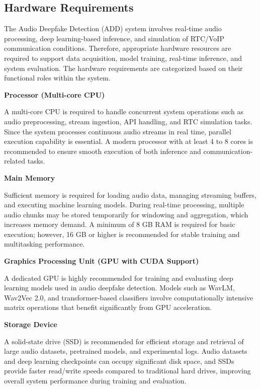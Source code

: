 \subsection{Hardware Requirements}

The Audio Deepfake Detection (ADD) system involves real-time audio processing, deep learning-based inference, and simulation of RTC/VoIP communication conditions. Therefore, appropriate hardware resources are required to support data acquisition, model training, real-time inference, and system evaluation. The hardware requirements are categorized based on their functional roles within the system.

\textbf{Processor (Multi-core CPU)}

A multi-core CPU is required to handle concurrent system operations such as audio preprocessing, stream ingestion, API handling, and RTC simulation tasks. Since the system processes continuous audio streams in real time, parallel execution capability is essential. A modern processor with at least 4 to 8 cores is recommended to ensure smooth execution of both inference and communication-related tasks.

\textbf{Main Memory}

Sufficient memory is required for loading audio data, managing streaming buffers, and executing machine learning models. During real-time processing, multiple audio chunks may be stored temporarily for windowing and aggregation, which increases memory demand. A minimum of 8 GB RAM is required for basic execution; however, 16 GB or higher is recommended for stable training and multitasking performance.

\textbf{Graphics Processing Unit (GPU with CUDA Support)}

A dedicated GPU is highly recommended for training and evaluating deep learning models used in audio deepfake detection. Models such as WavLM, Wav2Vec 2.0, and transformer-based classifiers involve computationally intensive matrix operations that benefit significantly from GPU acceleration. 

\textbf{Storage Device}

A solid-state drive (SSD) is recommended for efficient storage and retrieval of large audio datasets, pretrained models, and experimental logs. Audio datasets and deep learning checkpoints can occupy significant disk space, and SSDs provide faster read/write speeds compared to traditional hard drives, improving overall system performance during training and evaluation.

